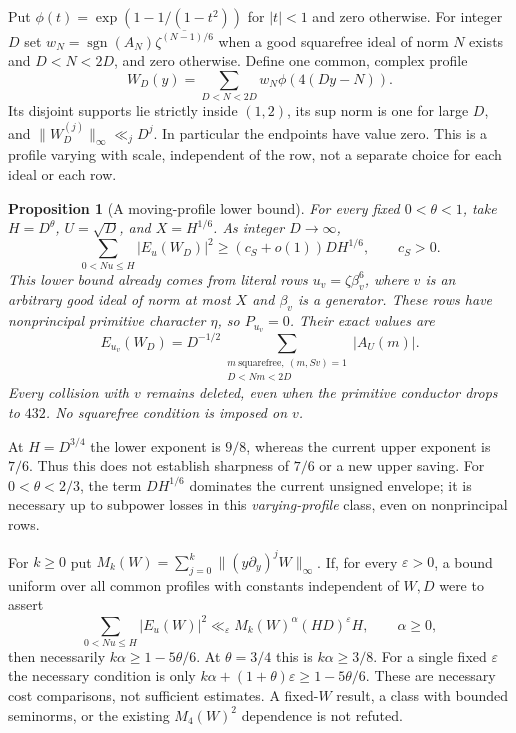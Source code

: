 \documentclass[11pt]{article}
\newtheorem{proposition}[theorem]{Proposition}
\theoremstyle{definition}\newtheorem{definition}[theorem]{Definition}
\theoremstyle{remark}\newtheorem{remark}[theorem]{Remark}
\begin{document}
Put $\phi(t)=\exp(1-1/(1-t^2))$ for $|t|<1$ and zero otherwise.
For integer $D$ set $w_N=\operatorname{sgn}(A_N)\overline{\zeta^{(N-1)/6}}$
when a good squarefree ideal of norm $N$ exists and $D<N<2D$, and zero
otherwise. Define one common, complex profile
\begin{equation}\label{prf:profile}
 W_D(y)=\sum_{D<N<2D}w_N\phi(4(Dy-N)).
\end{equation}
Its disjoint supports lie strictly inside $(1,2)$, its sup norm is one for
large $D$, and $\|W_D^{(j)}\|_\infty\ll_jD^j$. In particular the endpoints
have value zero. This is a profile varying with scale, independent of the
row, not a separate choice for each ideal or each row.

\begin{proposition}[A moving-profile lower bound]\label{prf:lower}
For every fixed $0<\theta<1$, take $H=D^\theta$, $U=\sqrt D$, and
$X=H^{1/6}$. As integer $D\to\infty$,
\begin{equation}\label{prf:lower-bound}
 \sum_{0<Nu\le H}|E_u(W_D)|^2\ge(c_S+o(1))DH^{1/6},\qquad c_S>0.
\end{equation}
This lower bound already comes from literal rows
$u_v=\zeta\beta_v^6$, where $v$ is an arbitrary good ideal of norm at most
$X$ and $\beta_v$ is a generator. These rows have nonprincipal primitive
character $\eta$, so $P_{u_v}=0$. Their exact values are
\begin{equation}\label{prf:row}
 E_{u_v}(W_D)=D^{-1/2}
 \sum_{\substack{m\ \mathrm{squarefree},\ (m,Sv)=1\\D<Nm<2D}}
                      |A_U(m)|.
\end{equation}
Every collision with $v$ remains deleted, even when the primitive conductor
drops to $432$. No squarefree condition is imposed on $v$.
\end{proposition}
At $H=D^{3/4}$ the lower exponent is $9/8$, whereas the current upper
exponent is $7/6$. Thus this does not establish sharpness of $7/6$ or a new
upper saving. For $0<\theta<2/3$, the term $DH^{1/6}$ dominates the current
unsigned envelope; it is necessary up to subpower losses in this
\emph{varying-profile} class, even on nonprincipal rows.

For $k\ge0$ put
$M_k(W)=\sum_{j=0}^k\|(y\partial_y)^jW\|_\infty$.
If, for every $\varepsilon>0$, a bound uniform over all common profiles
with constants independent of $W,D$ were to assert
\[
 \sum_{0<Nu\le H}|E_u(W)|^2
 \ll_\varepsilon M_k(W)^\alpha(HD)^\varepsilon H,
 \qquad \alpha\ge0,
\]
then necessarily $k\alpha\ge1-5\theta/6$. At $\theta=3/4$ this is
$k\alpha\ge3/8$. For a single fixed $\varepsilon$ the necessary condition
is only $k\alpha+(1+\theta)\varepsilon\ge1-5\theta/6$.
These are necessary cost comparisons, not sufficient estimates. A
fixed-$W$ result, a class with bounded seminorms, or the existing
$M_4(W)^2$ dependence is not refuted.
\end{document}
